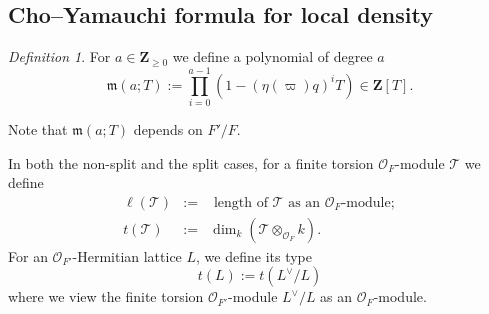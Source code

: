 \documentclass[reqno]{amsart}
\numberwithin{equation}{section}
\newcommand{\rd}{\mathrm{d}}
\newcommand{\iden}{\langle1\rangle}
\newcommand{\pDen}{\partial\mathrm{Den}}
\newcommand{\val}{{\mathrm{val}}}
\newcommand{\Z}{\mathbf{Z}}
\DeclareMathOperator{\rank}{rank}
\DeclareMathOperator{\Den}{Den}
\newcommand\ot{\otimes}
\newcommand{\y}{\eta}
\newcommand\cO{\mathcal{O}}
\newcommand\cT{\mathcal{T}}
\newcommand\fm{\mathfrak{m}}
\theoremstyle{remark}
\newtheorem{defn}[thm]{Definition}
\numberwithin{equation}{section}
\begin{document}
\subsection{Cho--Yamauchi formula for local density}\label{ssec: Cho-Yamauchi}


%
%

\begin{defn}\label{def:maT}
For $a\in \Z_{\ge0}$ we define  a polynomial of degree $a$
\begin{equation*}
\fm(a; T) := \prod_{i=0}^{a-1}(1-(\y(\varpi)q)^i T) \in \Z[T].
\end{equation*}
\end{defn}
Note that $\fm(a; T)$ depends on $F'/F$. 

In both the non-split and the split cases, for a finite torsion $\cO_{F}$-module $\cT$ we define 
\begin{eqnarray*}
\label{def ell}\ell(\cT)&:=&\mbox{ length of $\cT$ as an $\cO_{F}$-module};\\
\label{def t} t(\cT)&:=&\dim_{k}(\cT\ot_{\cO_{F}}k).
\end{eqnarray*}
For an $\cO_{F'}$-Hermitian lattice $L$, we define its type 
$$
t(L):=t(L^\vee/L)
$$
where we view the finite torsion $\cO_{F'}$-module $L^\vee/L$ as an $\cO_{F}$-module.   
\end{document}
